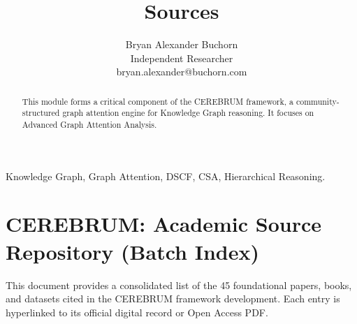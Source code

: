 \documentclass[10pt,journal,compsoc]{IEEEtran}
\begin{document}
\title{Sources}
\author{Bryan Alexander Buchorn \\ Independent Researcher \\ bryan.alexander@buchorn.com}

\maketitle

\begin{abstract}
This module forms a critical component of the CEREBRUM framework, a community-structured graph attention engine for Knowledge Graph reasoning. It focuses on Advanced Graph Attention Analysis.
\end{abstract}

\begin{IEEEkeywords}
Knowledge Graph, Graph Attention, DSCF, CSA, Hierarchical Reasoning.
\end{IEEEkeywords}

\section{CEREBRUM: Academic Source Repository (Batch Index)}

This document provides a conso\-lidated list of the 45 found\-ational papers, books, and datasets cited in the CEREBRUM framework development. Each entry is hyperlinked to its official digital record or Open Access PDF.
\end{document}

